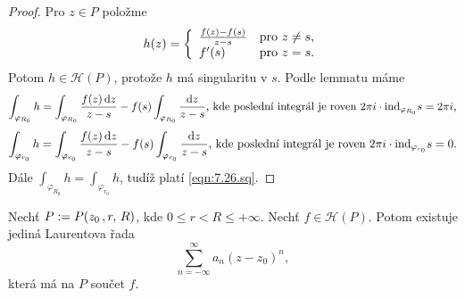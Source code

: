 \begin{proof}
Pro $z \in P$ položme 
\begin{equation*}
    h(z)=\left\{ \begin{array}{ll} \frac{f(z)-f(s)}{z-s} & \mbox{pro } z \neq s, \\ f'(s) & \mbox{pro } z=s. \end{array} \right.
\end{equation*}
Potom $h \in \mathcal{H}(P)$, protože $h$ má  singularitu v $s$. Podle lemmatu máme
$$
\int_{\varphi_{R_0}}h=\int_{\varphi_{R_0}}\frac{f(z) \mathop{}\!\mathrm{d} z}{z-s}-f(s) \int_{\varphi_{R_0}}\frac{\mathop{}\!\mathrm{d} z}{z-s}\text{, kde poslední integrál je roven }2\pi i \cdot \text{ind}_{\varphi_{R_0}}s=2 \pi i\text{,}
$$
$$
\int_{\varphi_{r_0}}h=\int_{\varphi_{r_0}}\frac{f(z) \mathop{}\!\mathrm{d} z}{z-s}-f(s) \int_{\varphi_{r_0}}\frac{\mathop{}\!\mathrm{d} z}{z-s}\text{, kde poslední integrál je roven }2\pi i \cdot \text{ind}_{\varphi_{r_0}}s=0{.}
$$
Dále $\int_{\varphi_{R_0}}h=\int_{\varphi_{r_0}}h$, tudíž platí \cref{eqn:7.26.sq}.
\end{proof}

\begin{theorem}
Nechť $P:= \\ P(z_0\,,r,\,R)$, kde $0\leq r < R \leq + \infty$. Nechť $f \in \mathcal{H}(P)$. Potom existuje jediná Laurentova řada 
\begin{equation}
    \sum\limits_{n=-\infty}^{\infty} a_n(z-z_0)^n,  
    \tag{L}
    \label{eqn:7.27.lau}
\end{equation}
která má na $P$ součet $f$.
\end{theorem}

